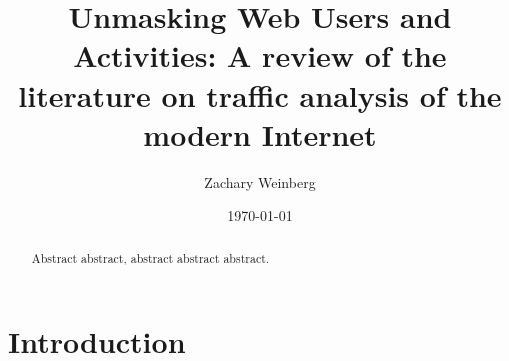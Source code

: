 \documentclass{zarticle}
\begin{document}
\title{Unmasking Web Users and Activities:
  A review of the literature on traffic analysis of the modern Internet}
\author{Zachary Weinberg}
\date{\today}
\maketitle

\begin{abstract}
Abstract abstract, abstract abstract abstract.
\end{abstract}

\section{Introduction}

\nocite{*}\printbibliography
\end{document}
